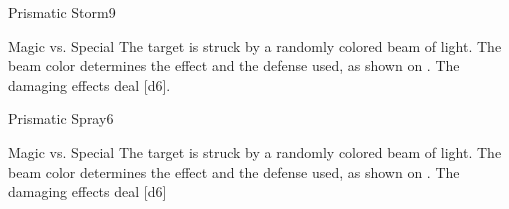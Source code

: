 \begin{spellsection}{Prismatic Storm}{9}
    \begin{spellheader}
    \end{spellheader}
    \begin{spellcontent}
        \begin{spelltargetinginfo}
        \end{spelltargetinginfo}
        \begin{spelleffects}
            \begin{spellattack}{Magic vs. Special}
                \spellspecial The target is struck by a randomly colored beam of light. The beam color determines the effect and the defense used, as shown on . The damaging effects deal [d6].
            \end{spellattack}
        \end{spelleffects}
    \end{spellcontent}
    \begin{spellfooter}
        \miscastyou
    \end{spellfooter}
\end{spellsection}

\begin{spellsection}{Prismatic Spray}{6}
    \begin{spellheader}
    \end{spellheader}
    \begin{spellcontent}
        \begin{spelltargetinginfo}
        \end{spelltargetinginfo}
        \begin{spelleffects}
            \begin{spellattack}{Magic vs. Special}
                \spellspecial The target is struck by a randomly colored beam of light. The beam color determines the effect and the defense used, as shown on . The damaging effects deal [d6]
            \end{spellattack}
        \end{spelleffects}
    \end{spellcontent}
    \begin{spellfooter}
        \miscastexplode
    \end{spellfooter}
\end{spellsection}

